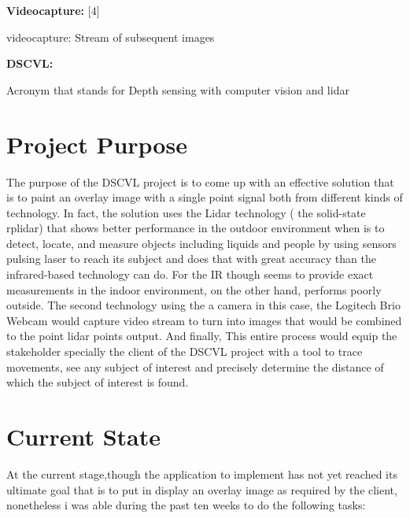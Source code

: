 \documentclass[10pt,draftclsnofoot,onecolumn,journal,compsoc]{IEEEtran}
\begin{document}
\begin{singlespace}
		\textbf{Videocapture: }\label{def:videocapture}[4]\par
		videocapture: Stream of subsequent images
		
		\textbf{DSCVL: }\label{def:DSCVL}\par
		Acronym that stands for Depth sensing with computer vision and lidar


		
		
	\section{Project Purpose}
The purpose of the DSCVL project is to come up with an effective solution that is to paint an overlay image with a single point signal both from different kinds of technology. In fact, the solution uses the Lidar technology ( the solid-state rplidar) that shows better performance in the outdoor environment when is to detect, locate, and measure objects   including liquids and people by using sensors pulsing laser to reach its subject and does that with great accuracy than the infrared-based technology can do. For the IR though seems to provide exact measurements in the indoor environment, on the other hand, performs poorly outside. The second technology using the a camera in this case, the Logitech Brio Webcam would capture video stream to turn into images that would be combined to the point lidar points output. And finally, This entire process   would equip the  stakeholder specially the client of the DSCVL project with a tool to trace movements, see any subject of interest and precisely determine the distance of which the subject of interest is found.	


\section{Current State}
At the current stage,though the application to implement has not yet reached its ultimate goal that is to put in display an overlay image as required by the client, nonetheless i was able during the past ten weeks to do the following tasks:


\end{singlespace}
\end{document}

